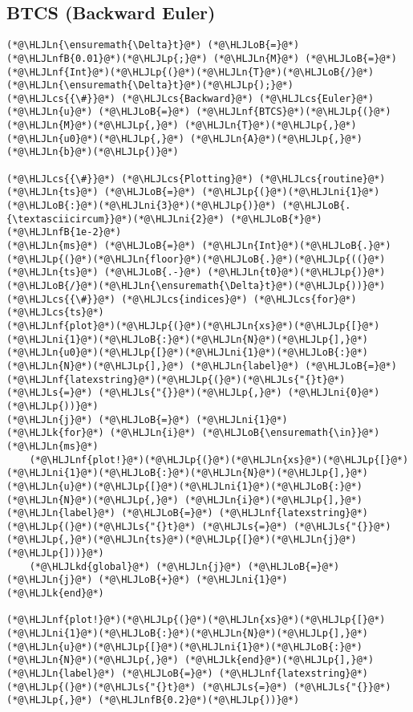\documentclass[12pt,a4paper]{article}
\newcommand{\HLJLk}[1]{\textcolor[RGB]{148,91,176}{\textbf{#1}}}
\newcommand{\HLJLkd}[1]{\textcolor[RGB]{214,102,97}{\textit{#1}}}
\newcommand{\HLJLn}[1]{#1}
\newcommand{\HLJLnf}[1]{\textcolor[RGB]{66,102,213}{#1}}
\newcommand{\HLJLs}[1]{\textcolor[RGB]{201,61,57}{#1}}
\newcommand{\HLJLnfB}[1]{\textcolor[RGB]{59,151,46}{#1}}
\newcommand{\HLJLni}[1]{\textcolor[RGB]{59,151,46}{#1}}
\newcommand{\HLJLoB}[1]{\textcolor[RGB]{102,102,102}{\textbf{#1}}}
\newcommand{\HLJLp}[1]{#1}
\newcommand{\HLJLcs}[1]{\textcolor[RGB]{153,153,119}{\textit{#1}}}
\begin{document}
\subsection{BTCS (Backward Euler)}

\begin{lstlisting}
(*@\HLJLn{\ensuremath{\Delta}t}@*) (*@\HLJLoB{=}@*) (*@\HLJLnfB{0.01}@*)(*@\HLJLp{;}@*) (*@\HLJLn{M}@*) (*@\HLJLoB{=}@*) (*@\HLJLnf{Int}@*)(*@\HLJLp{(}@*)(*@\HLJLn{T}@*)(*@\HLJLoB{/}@*)(*@\HLJLn{\ensuremath{\Delta}t}@*)(*@\HLJLp{);}@*)
(*@\HLJLcs{{\#}}@*) (*@\HLJLcs{Backward}@*) (*@\HLJLcs{Euler}@*)
(*@\HLJLn{u}@*) (*@\HLJLoB{=}@*) (*@\HLJLnf{BTCS}@*)(*@\HLJLp{(}@*)(*@\HLJLn{M}@*)(*@\HLJLp{,}@*) (*@\HLJLn{T}@*)(*@\HLJLp{,}@*) (*@\HLJLn{u0}@*)(*@\HLJLp{,}@*) (*@\HLJLn{A}@*)(*@\HLJLp{,}@*) (*@\HLJLn{b}@*)(*@\HLJLp{)}@*)

(*@\HLJLcs{{\#}}@*) (*@\HLJLcs{Plotting}@*) (*@\HLJLcs{routine}@*)
(*@\HLJLn{ts}@*) (*@\HLJLoB{=}@*) (*@\HLJLp{(}@*)(*@\HLJLni{1}@*)(*@\HLJLoB{:}@*)(*@\HLJLni{3}@*)(*@\HLJLp{)}@*) (*@\HLJLoB{.{\textasciicircum}}@*)(*@\HLJLni{2}@*) (*@\HLJLoB{*}@*) (*@\HLJLnfB{1e-2}@*)
(*@\HLJLn{ms}@*) (*@\HLJLoB{=}@*) (*@\HLJLn{Int}@*)(*@\HLJLoB{.}@*)(*@\HLJLp{(}@*)(*@\HLJLn{floor}@*)(*@\HLJLoB{.}@*)(*@\HLJLp{((}@*)(*@\HLJLn{ts}@*) (*@\HLJLoB{.-}@*) (*@\HLJLn{t0}@*)(*@\HLJLp{)}@*)(*@\HLJLoB{/}@*)(*@\HLJLn{\ensuremath{\Delta}t}@*)(*@\HLJLp{))}@*)(*@\HLJLcs{{\#}}@*) (*@\HLJLcs{indices}@*) (*@\HLJLcs{for}@*) (*@\HLJLcs{ts}@*)
(*@\HLJLnf{plot}@*)(*@\HLJLp{(}@*)(*@\HLJLn{xs}@*)(*@\HLJLp{[}@*)(*@\HLJLni{1}@*)(*@\HLJLoB{:}@*)(*@\HLJLn{N}@*)(*@\HLJLp{],}@*) (*@\HLJLn{u0}@*)(*@\HLJLp{[}@*)(*@\HLJLni{1}@*)(*@\HLJLoB{:}@*)(*@\HLJLn{N}@*)(*@\HLJLp{],}@*) (*@\HLJLn{label}@*) (*@\HLJLoB{=}@*) (*@\HLJLnf{latexstring}@*)(*@\HLJLp{(}@*)(*@\HLJLs{"{}t}@*) (*@\HLJLs{=}@*) (*@\HLJLs{"{}}@*)(*@\HLJLp{,}@*) (*@\HLJLni{0}@*) (*@\HLJLp{))}@*)
(*@\HLJLn{j}@*) (*@\HLJLoB{=}@*) (*@\HLJLni{1}@*)
(*@\HLJLk{for}@*) (*@\HLJLn{i}@*) (*@\HLJLoB{\ensuremath{\in}}@*) (*@\HLJLn{ms}@*)
    (*@\HLJLnf{plot!}@*)(*@\HLJLp{(}@*)(*@\HLJLn{xs}@*)(*@\HLJLp{[}@*)(*@\HLJLni{1}@*)(*@\HLJLoB{:}@*)(*@\HLJLn{N}@*)(*@\HLJLp{],}@*) (*@\HLJLn{u}@*)(*@\HLJLp{[}@*)(*@\HLJLni{1}@*)(*@\HLJLoB{:}@*)(*@\HLJLn{N}@*)(*@\HLJLp{,}@*) (*@\HLJLn{i}@*)(*@\HLJLp{],}@*) (*@\HLJLn{label}@*) (*@\HLJLoB{=}@*) (*@\HLJLnf{latexstring}@*)(*@\HLJLp{(}@*)(*@\HLJLs{"{}t}@*) (*@\HLJLs{=}@*) (*@\HLJLs{"{}}@*)(*@\HLJLp{,}@*)(*@\HLJLn{ts}@*)(*@\HLJLp{[}@*)(*@\HLJLn{j}@*)(*@\HLJLp{]))}@*)
    (*@\HLJLkd{global}@*) (*@\HLJLn{j}@*) (*@\HLJLoB{=}@*) (*@\HLJLn{j}@*) (*@\HLJLoB{+}@*) (*@\HLJLni{1}@*)
(*@\HLJLk{end}@*)

(*@\HLJLnf{plot!}@*)(*@\HLJLp{(}@*)(*@\HLJLn{xs}@*)(*@\HLJLp{[}@*)(*@\HLJLni{1}@*)(*@\HLJLoB{:}@*)(*@\HLJLn{N}@*)(*@\HLJLp{],}@*) (*@\HLJLn{u}@*)(*@\HLJLp{[}@*)(*@\HLJLni{1}@*)(*@\HLJLoB{:}@*)(*@\HLJLn{N}@*)(*@\HLJLp{,}@*) (*@\HLJLk{end}@*)(*@\HLJLp{],}@*) (*@\HLJLn{label}@*) (*@\HLJLoB{=}@*) (*@\HLJLnf{latexstring}@*)(*@\HLJLp{(}@*)(*@\HLJLs{"{}t}@*) (*@\HLJLs{=}@*) (*@\HLJLs{"{}}@*)(*@\HLJLp{,}@*) (*@\HLJLnfB{0.2}@*)(*@\HLJLp{))}@*)
\end{lstlisting}
\end{document}
